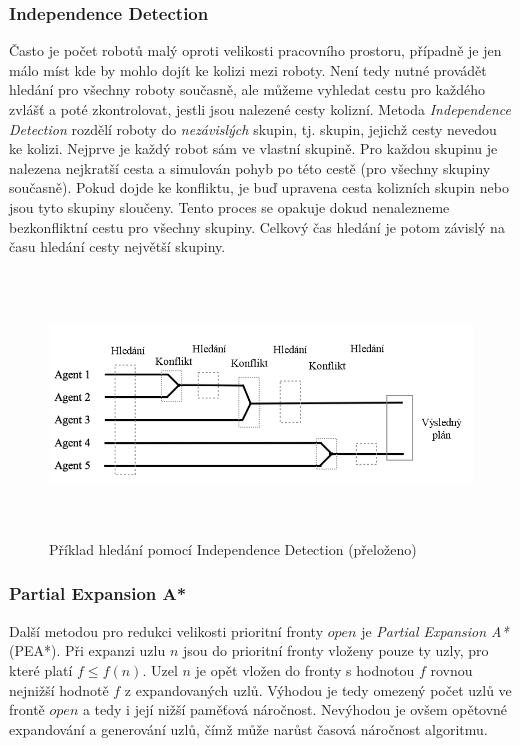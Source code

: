 \subsubsection{Independence Detection}
Často je počet robotů malý oproti velikosti pracovního prostoru, případně je jen málo míst kde by mohlo dojít ke kolizi mezi roboty. Není tedy nutné provádět hledání pro všechny roboty současně, ale můžeme vyhledat cestu pro každého zvlášť a poté zkontrolovat, jestli jsou nalezené cesty kolizní. Metoda \emph{Independence Detection} rozdělí roboty do \emph{nezávislých} skupin, tj. skupin, jejichž cesty nevedou ke kolizi. Nejprve je každý robot sám ve vlastní skupině. Pro každou skupinu je nalezena nejkratší cesta a simulován pohyb po této cestě (pro všechny skupiny současně). Pokud dojde ke konfliktu, je buď upravena cesta kolizních skupin nebo jsou tyto skupiny sloučeny. Tento proces se opakuje dokud nenalezneme bezkonfliktní cestu pro všechny skupiny. Celkový čas hledání je potom závislý na času hledání cesty největší skupiny. 

\begin{figure}[h!]
	\begin{center}
		\includegraphics*[width=15cm,height=7cm,keepaspectratio]{obr/independenceDetection2}
	\end{center}
	\caption{Příklad hledání pomocí Independence Detection \cite{Kraft2017} (přeloženo)}
	\label{obr:independenceDetection}
\end{figure}

\subsubsection{Partial Expansion A*}
Další metodou pro redukci velikosti prioritní fronty $open$ je \emph{Partial Expansion A*} (PEA*). Při expanzi uzlu $n$ jsou do prioritní fronty vloženy pouze ty uzly, pro které platí $f\leq f(n)$. Uzel $n$ je opět vložen do fronty s hodnotou $f$ rovnou nejnižší hodnotě $f$ z expandovaných uzlů. Výhodou je tedy omezený počet uzlů ve frontě $open$ a tedy i její nižší paměťová náročnost. Nevýhodou je ovšem opětovné expandování a generování uzlů, čímž může narůst časová náročnost algoritmu.

